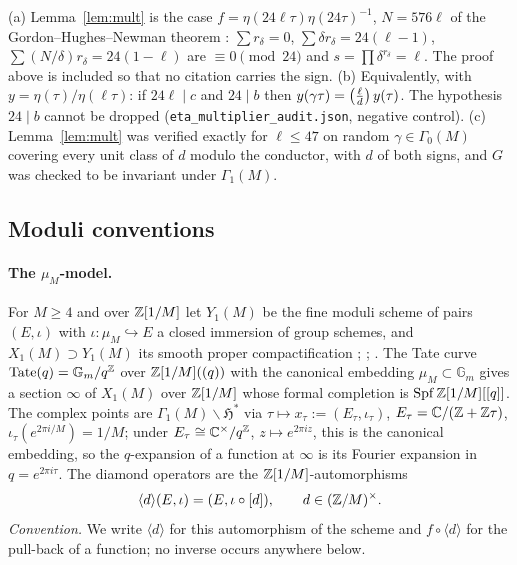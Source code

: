 \begin{remark}
(a) Lemma~\ref{lem:mult} is the case $f=\eta(24\ell\tau)\eta(24\tau)^{-1}$, $N=576\ell$ of the
Gordon--Hughes--Newman theorem \citep[Thm.~1.64]{Ono04}: $\sum r_\delta=0$,
$\sum\delta r_\delta=24(\ell-1)$, $\sum(N/\delta)r_\delta=24(1-\ell)$ are $\equiv0\pmod{24}$ and
$s=\prod\delta^{r_\delta}=\ell$. The proof above is included so that no citation carries the sign.
(b) Equivalently, with $y=\eta(\tau)/\eta(\ell\tau)$: if $24\ell\mid c$ and $24\mid b$ then
$y(\gamma\tau)=\left(\frac{\ell}{d}\right)y(\tau)$. The hypothesis $24\mid b$ cannot be dropped
(\texttt{eta\_multiplier\_audit.json}, negative control). (c) Lemma~\ref{lem:mult} was verified
exactly for $\ell\le47$ on random $\gamma\in\Gamma_0(M)$ covering every unit class of $d$ modulo the
conductor, with $d$ of both signs, and $G$ was checked to be invariant under $\Gamma_1(M)$.
\end{remark}

\subsection{Moduli conventions}\label{subsec:moduli}

\paragraph{The $\mu_M$-model.} For $M\ge4$ and over $\mathbb Z[1/M]$ let $Y_1(M)$ be the fine moduli
scheme of pairs $(E,\iota)$ with $\iota:\mu_M\hookrightarrow E$ a closed immersion of group schemes,
and $X_1(M)\supset Y_1(M)$ its smooth proper compactification
\citep[IV--V]{DR73}; \citep[\S2]{Gross90}; \citep[\S1]{Katz76}. The Tate curve
$\mathrm{Tate}(q)=\mathbb G_m/q^{\mathbb Z}$ over $\mathbb Z[1/M]((q))$ with the canonical embedding
$\mu_M\subset\mathbb G_m$ gives a section $\infty$ of $X_1(M)$ over $\mathbb Z[1/M]$ whose formal
completion is $\operatorname{Spf}\mathbb Z[1/M][[q]]$. The complex points are $\Gamma_1(M)\backslash\mathfrak H^*$
via $\tau\mapsto x_\tau:=(E_\tau,\iota_\tau)$, $E_\tau=\mathbb C/(\mathbb Z+\mathbb Z\tau)$,
$\iota_\tau(e^{2\pi i/M})=1/M$; under $E_\tau\cong\mathbb C^\times/q^\mathbb Z$, $z\mapsto e^{2\pi iz}$,
this is the canonical embedding, so the $q$-expansion of a function at $\infty$ is its Fourier
expansion in $q=e^{2\pi i\tau}$. The diamond operators are the $\mathbb Z[1/M]$-automorphisms
\[
\langle d\rangle(E,\iota)=(E,\iota\circ[d]),\qquad d\in(\mathbb Z/M)^\times .
\]
\emph{Convention.} We write $\langle d\rangle$ for this automorphism of the scheme and
$f\circ\langle d\rangle$ for the pull-back of a function; no inverse occurs anywhere below.

